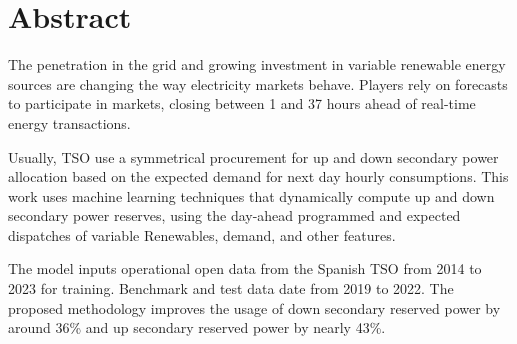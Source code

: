 \chapter{Abstract}
\justifying
The penetration in the grid and growing investment in variable renewable energy sources are changing the way electricity markets behave. Players rely on forecasts to participate in markets, closing between 1 and 37 hours ahead of real-time energy transactions. \par
Usually, \gls{TSO} use a symmetrical procurement for up and down secondary power allocation based on the expected demand for next day hourly consumptions. This work uses machine learning techniques that dynamically compute up and down secondary power reserves, using the day-ahead programmed and expected dispatches of variable Renewables, demand, and other features.\par
The model inputs operational open data from the Spanish \gls{TSO} from 2014 to 2023 for training. Benchmark and test data date from 2019 to 2022. The proposed methodology improves the usage of down secondary reserved power by around 36\% and up secondary reserved power by nearly 43\%.\par



\vspace{0.5cm} %

